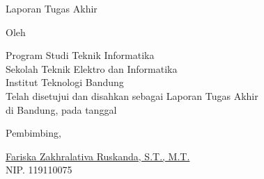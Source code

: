 \clearpage
\pagestyle{empty}

\begin{center}
    \smallskip
    
    \Large \bfseries \MakeUppercase{\thetitle}
    \vfill
    
    \Large Laporan Tugas Akhir
    \vfill
    
    \large Oleh
    
    \Large \theauthor
    
    \large Program Studi Teknik Informatika \\
    
    \normalsize \normalfont
    Sekolah Teknik Elektro dan Informatika \\
    Institut Teknologi Bandung \\
    
    \vfill
    \normalsize \normalfont
    Telah disetujui dan disahkan sebagai Laporan Tugas Akhir \\
    di Bandung, pada tanggal \tanggalpengesahan
    
    \vspace{0.5cm}
    Pembimbing,
    
    \vfill
    \underline{Fariska Zakhralativa Ruskanda, S.T., M.T.} \\
    NIP. 119110075
    
\end{center}
\clearpage
